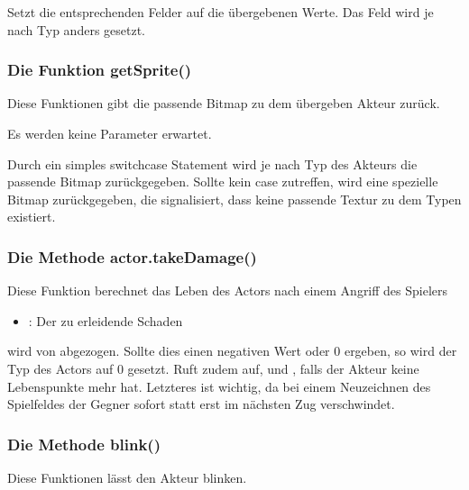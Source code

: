 \documentclass[letterpaper,10pt,ngerman]{sphinxmanual}
\let\sphinxpxdimen\pdfpxdimen\else\newdimen\sphinxpxdimen
\begin{document}

Setzt die entsprechenden Felder auf die übergebenen Werte. Das Feld 
wird je nach Typ anders gesetzt.


\subsubsection{Die Funktion getSprite()}
\label{\detokenize{programming:die-funktion-getsprite}}
Diese Funktionen gibt die passende Bitmap zu dem übergeben Akteur zurück.


Es werden keine Parameter erwartet.


Durch ein simples switch\sphinxhyphen{}case Statement wird je nach Typ des Akteurs die
passende Bitmap zurückgegeben. Sollte kein case zutreffen, wird eine spezielle
Bitmap zurückgegeben, die signalisiert, dass keine passende Textur zu dem Typen
existiert.

\noindent\sphinxincludegraphics[width=100\sphinxpxdimen]{{nosprite}.png}


\subsubsection{Die Methode actor.takeDamage()}
\label{\detokenize{programming:die-methode-actor-takedamage}}
Diese Funktion berechnet das Leben des Actors nach einem Angriff des Spielers

\begin{itemize}
\item {} 
: Der zu erleidende Schaden

\end{itemize}


 wird von  abgezogen. Sollte dies einen negativen Wert oder
0  ergeben, so wird der Typ des Actors auf 0 gesetzt. Ruft zudem 
auf, und , falls der Akteur keine Lebenspunkte mehr hat. Letzteres
ist wichtig, da bei einem Neuzeichnen des Spielfeldes der Gegner sofort
statt erst im nächsten Zug verschwindet.


\subsubsection{Die Methode blink()}
\label{\detokenize{programming:die-methode-blink}}
Diese Funktionen lässt den Akteur blinken.
\end{document}
